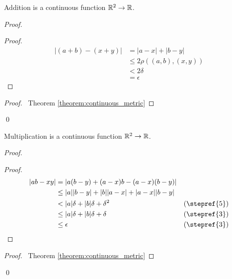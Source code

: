 \begin{theorem}
    Addition is a continuous function $\mathbb{R}^2 \rightarrow \mathbb{R}$.
\end{theorem}

\begin{proof}
    \pf
    \begin{proof}
        \pf
        \begin{align*}
            |(a+b)-(x+y)| & = |a-x| + |b-y| \\
            & \leq 2 \rho((a,b),(x,y)) \\
            & < 2 \delta \\
            & = \epsilon
        \end{align*}
    \end{proof}
    \qedstep
    \begin{proof}
        \pf\ Theorem \ref{theorem:continuous_metric}
    \end{proof}
    \qed
\end{proof}

\begin{theorem}
    Multiplication is a continuous function $\mathbb{R}^2 \rightarrow \mathbb{R}$.
\end{theorem}

\begin{proof}
    \pf
    \begin{proof}
        \pf
        \begin{align*}
            |ab - xy| & = |a(b-y) + (a-x)b - (a-x)(b-y)| \\
            & \leq |a| |b-y| + |b| |a-x| + |a-x| |b-y| \\
            & < |a| \delta + |b| \delta + \delta^2 & (\text{\stepref{5}})\\
            & \leq |a| \delta + |b| \delta + \delta & (\text{\stepref{3}})\\
            & \leq \epsilon & (\text{\stepref{3}})
        \end{align*}
    \end{proof}
    \qedstep
    \begin{proof}
        \pf\ Theorem \ref{theorem:continuous_metric}
    \end{proof}
    \qed
\end{proof}

